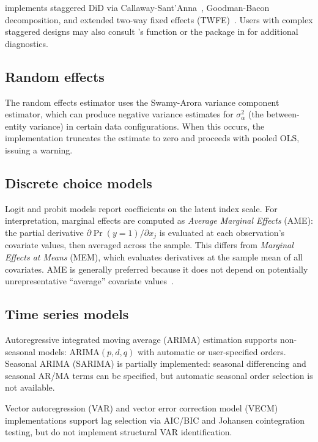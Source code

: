  implements staggered DiD via
Callaway-Sant'Anna~\citep{Callaway+SantAnna:2021}, Goodman-Bacon decomposition, and extended
two-way fixed effects (TWFE)~\citep{Wooldridge:2025}. Users with complex staggered designs may also
consult 's  function or the  package in
 for additional diagnostics.

\subsection{Random effects}

The random effects estimator uses the Swamy-Arora variance component estimator,
which can produce negative variance estimates for $\sigma^2_\alpha$ (the
between-entity variance) in certain data configurations. When this occurs,
the implementation truncates the estimate to zero and proceeds with pooled
OLS, issuing a warning.

\subsection{Discrete choice models}

Logit and probit models report coefficients on the latent index scale. For
interpretation, marginal effects are computed as \emph{Average Marginal Effects}
(AME): the partial derivative $\partial \Pr(y=1)/\partial x_j$ is evaluated
at each observation's covariate values, then averaged across the sample.
This differs from \emph{Marginal Effects at Means} (MEM), which evaluates
derivatives at the sample mean of all covariates. AME is generally preferred
because it does not depend on potentially unrepresentative ``average''
covariate values~\citep{Cameron+Trivedi:2005}.

\subsection{Time series models}

Autoregressive integrated moving average (ARIMA) estimation supports
non-seasonal models: ARIMA$(p,d,q)$ with automatic or user-specified orders. Seasonal ARIMA (SARIMA) is partially implemented:
seasonal differencing and seasonal AR/MA terms can be specified, but automatic
seasonal order selection is not available.

Vector autoregression (VAR) and vector error correction model (VECM)
implementations support lag selection via AIC/BIC and Johansen
cointegration testing, but do not implement structural VAR identification.

